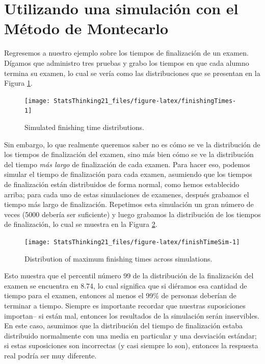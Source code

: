 \documentclass[
  12pt,
]{book}
\begin{document}
\hypertarget{utilizando-una-simulaciuxf3n-con-el-muxe9todo-de-montecarlo}{%
\section{Utilizando una simulación con el Método de Montecarlo}\label{utilizando-una-simulaciuxf3n-con-el-muxe9todo-de-montecarlo}}

Regresemos a nuestro ejemplo sobre los tiempos de finalización de un examen. Dígamos que administro tres pruebas y grabo los tiempos en que cada alumno termina su examen, lo cual se vería como las distribuciones que se presentan en la Figura \ref{fig:finishingTimes}.

\begin{figure}
\texttt{[image: StatsThinking21\_files/figure-latex/finishingTimes-1]} \caption{Simulated finishing time distributions.}\label{fig:finishingTimes}
\end{figure}

Sin embargo, lo que realmente queremos saber no es cómo se ve la distribución de los tiempos de finalización del examen, sino más bien cómo se ve la distribución del tiempo \emph{más largo} de finalización de cada examen. Para hacer eso, podemos simular el tiempo de finalización para cada examen, asumiendo que los tiempos de finalización están distribuidos de forma normal, como hemos establecido arriba; para cada uno de estas simulaciones de examenes, después grabamos el tiempo más largo de finalización. Repetimos esta simulación un gran número de veces (5000 debería ser suficiente) y luego grabamos la distribución de los tiempos de finalización, lo cual se muestra en la Figura \ref{fig:finishTimeSim}.

\begin{figure}
\texttt{[image: StatsThinking21\_files/figure-latex/finishTimeSim-1]} \caption{Distribution of maximum finishing times across simulations.}\label{fig:finishTimeSim}
\end{figure}

Esto muestra que el percentil número 99 de la distribución de la finalización del examen se encuentra en 8.74, lo cual significa que si diéramos esa cantidad de tiempo para el examen, entonces al menos el 99\% de personas deberían de terminar a tiempo. Siempre es importante recordar que nuestras suposiciones importan-- si están mal, entonces los resultados de la simulación serán inservibles. En este caso, asumimos que la distribución del tiempo de finalización estaba distribuido normalmente con una media en particular y una desviación estándar; si estas suposiciones son incorrectas (y casi siempre lo son), entonces la respuesta real podría ser muy diferente.
\end{document}
